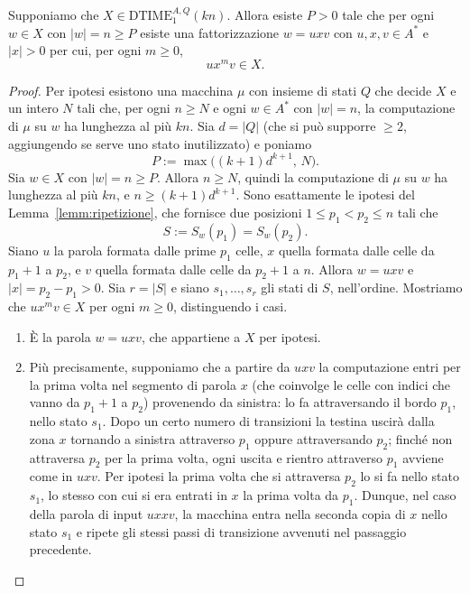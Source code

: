 \begin{lemm}\label{lemm:pumping}
Supponiamo che $X \in \text{DTIME}^{A,Q}_1(kn)$. Allora esiste $P > 0$ tale che per ogni $w \in X$ con $|w| = n \ge P$ esiste una fattorizzazione $w = uxv$ con $u, x, v \in A^*$ e $|x| > 0$ per cui, per ogni $m \ge 0$,
\[
u x^m v \in X.
\]
\begin{proof}
Per ipotesi esistono una macchina $\mu$ con insieme di stati $Q$ che decide $X$ e un intero $N$ tali che, per ogni $n \ge N$ e ogni $w \in A^*$ con $|w| = n$, la computazione di $\mu$ su $w$ ha lunghezza al più $kn$. Sia $d = |Q|$ (che si può supporre $\ge 2$, aggiungendo se serve uno stato inutilizzato) e poniamo
\[
P := \max\bigl((k+1)d^{k+1},\, N\bigr).
\]
Sia $w \in X$ con $|w| = n \ge P$. Allora $n \ge N$, quindi la computazione di $\mu$ su $w$ ha lunghezza al più $kn$, e $n \ge (k+1)d^{k+1}$. Sono esattamente le ipotesi del Lemma~\ref{lemm:ripetizione}, che fornisce due posizioni $1 \le p_1 < p_2 \le n$ tali che
\[
S := S_w(p_1) = S_w(p_2).
\]
Siano $u$ la parola formata dalle prime $p_1$ celle, $x$ quella formata dalle celle da $p_1+1$ a $p_2$, e $v$ quella formata dalle celle da $p_2+1$ a $n$. Allora $w = uxv$ e $|x| = p_2 - p_1 > 0$. 
Sia $r = |S|$ e siano $s_1, \dots, s_r$ gli stati di $S$, nell'ordine. Mostriamo che $ux^mv \in X$ per ogni $m \ge 0$, distinguendo i casi.
\begin{enumerate}
\item[$m = 1$:] È la parola $w = uxv$, che appartiene a $X$ per ipotesi.

\item[$m = 2$:] Più precisamente, supponiamo che a partire da $uxv$ la computazione entri per la prima volta nel segmento di parola $x$ (che coinvolge le celle con indici che vanno da $p_1+1$ a $p_2$) provenendo da sinistra: lo fa attraversando il bordo $p_1$, nello stato $s_1$. Dopo un certo numero di transizioni la testina uscirà dalla zona $x$ tornando a sinistra attraverso $p_1$ oppure attraversando $p_2$; finché non attraversa $p_2$ per la prima volta, ogni uscita e rientro attraverso $p_1$ avviene come in $uxv$. Per ipotesi la prima volta che si attraversa $p_2$ lo si fa nello stato $s_1$, lo stesso con cui si era entrati in $x$ la prima volta da $p_1$. Dunque, nel caso della parola di input $uxxv$, la macchina entra nella seconda copia di $x$ nello stato $s_1$ e ripete gli stessi passi di transizione avvenuti nel passaggio precedente.


\end{enumerate}
\end{proof}
\end{lemm}
